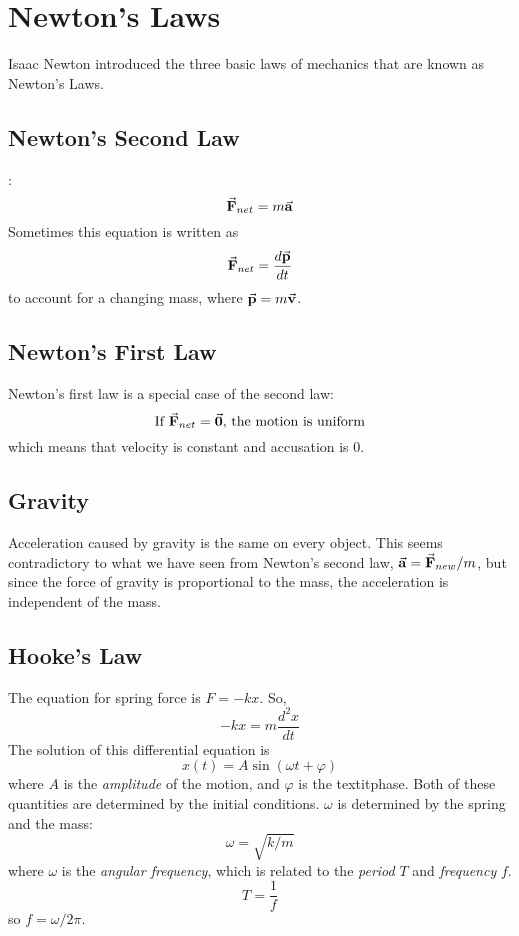 \section{Newton's Laws}
\indent Isaac Newton introduced the three basic laws of mechanics that are known as Newton's Laws.
\subsection*{Newton's Second Law}:
\begin{equation}
    \va{F}_{net} = m\va{a}
\end{equation}
Sometimes this equation is written as
\begin{equation}
    \va{F}_{net} = \frac{d\va{p}}{dt}
\end{equation}
to account for a changing mass, where $\va{p} = m\va{v}$. 
\subsection*{Newton's First Law}
Newton's first law is a special case of the second law:
\begin{equation}
    \text{If $\va{F}_{net} = \va{0}$, the motion is uniform}
\end{equation}
which means that velocity is constant and accusation is 0.
\subsection*{Gravity}
Acceleration caused by gravity is the same on every object. This seems contradictory to what we have seen from Newton's second law, $\va{a} = \va{F}_{new} / m$, but since the force of gravity is proportional to the mass, the acceleration is independent of the mass.
\subsection*{Hooke's Law}
The equation for spring force is $F = -kx$. So,
\begin{equation}
    -kx = m\frac{d^2x}{dt}
\end{equation}
The solution of this differential equation is 
\begin{equation}
    x(t) = A\sin(\omega t + \varphi)
\end{equation}
where $A$ is the \textit{amplitude} of the motion, and $\varphi$ is the textit{phase}. Both of these quantities are determined by the initial conditions. $\omega$ is determined by the spring and the mass:
\begin{equation}
    \omega = \sqrt{k / m}
\end{equation}
where $\omega$ is the \textit{angular frequency}, which is related to the \textit{period} $T$ and \textit{frequency} $f$. 
\begin{equation}
    T = \frac{1}{f}
\end{equation}
so $f = \omega/2\pi$.
